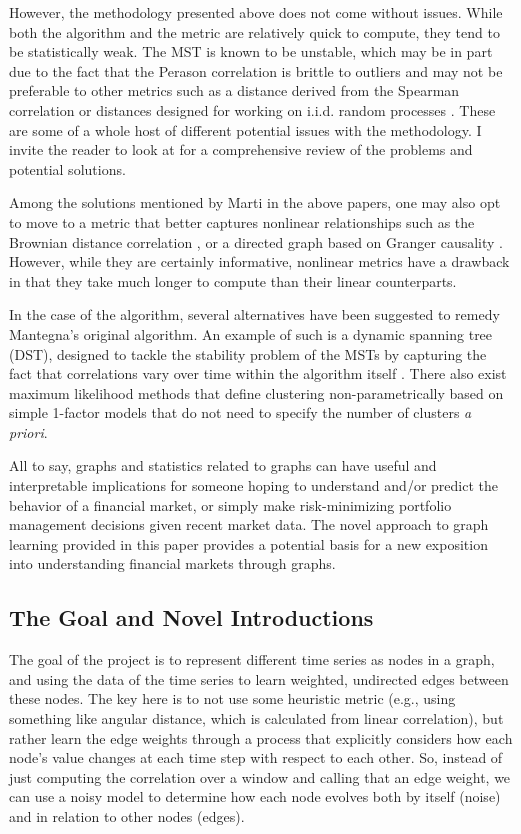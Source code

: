 \documentclass[12pt]{article}
\theoremstyle{definition}
\begin{document}
However, the methodology presented above does not come without issues. While both the algorithm and the metric are relatively quick to compute, they tend to be statistically weak. The MST is known to be unstable, which may be in part due to the fact that the Perason correlation is brittle to outliers and may not be preferable to other metrics such as a distance derived from the Spearman correlation or distances designed for working on i.i.d. random processes \cite{marti2015proposal}\cite{marti2015generic}. These are some of a whole host of different potential issues with the methodology. I invite the reader to look at \cite{networkSurveyFinance} for a comprehensive review of the problems and potential solutions. 

Among the solutions mentioned by Marti in the above papers, one may also opt to move to a metric that better captures nonlinear relationships such as the Brownian distance correlation \cite{distanceCorrelation}, or a directed graph based on Granger causality \cite{grangerCausalityNetworks}. However, while they are certainly informative, nonlinear metrics have a drawback in that they take much longer to compute than their linear counterparts.

In the case of the algorithm, several alternatives have been suggested to remedy Mantegna's original algorithm. An example of such is a dynamic spanning tree (DST), designed to tackle the stability problem of the MSTs by capturing the fact that correlations vary over time within the algorithm itself \cite{dynamicSpanningTrees}. There also exist maximum likelihood methods \cite{mleClustering} that define clustering non-parametrically based on simple 1-factor models that do not need to specify the number of clusters \textit{a priori}.

All to say, graphs and statistics related to graphs can have useful and interpretable implications for someone hoping to understand and/or predict the behavior of a financial market, or simply make risk-minimizing portfolio management decisions given recent market data. The novel approach to graph learning provided in this paper provides a potential basis for a new exposition into understanding financial markets through graphs.

\subsection{The Goal and Novel Introductions}
\label{sec:projectGoal}

The goal of the project is to represent different time series as nodes in a graph, and using the data of the time series to learn weighted, undirected edges between these nodes. The key here is to not use some heuristic metric (e.g., using something like angular distance, which is calculated from linear correlation), but rather learn the edge weights through a process that explicitly considers how each node's value changes at each time step with respect to each other. So, instead of just computing the correlation over a window and calling that an edge weight, we can use a noisy model to determine how each node evolves both by itself (noise) and in relation to other nodes (edges).
\end{document}
